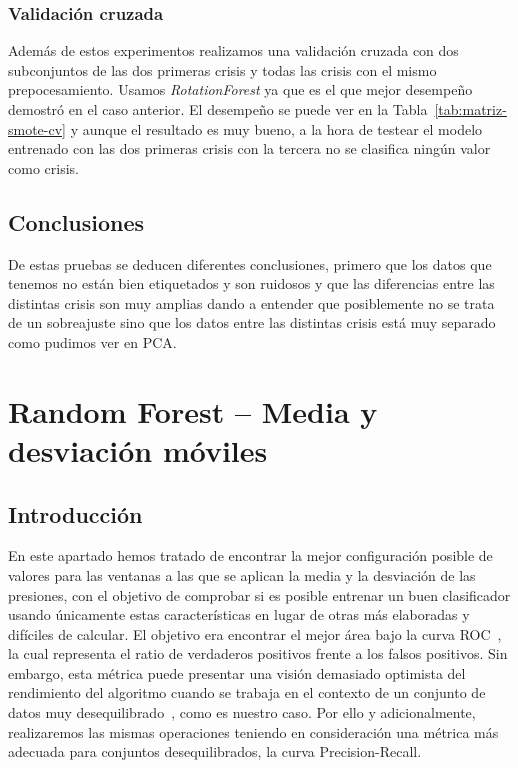 \documentclass[a4paper,12pt,twoside,oldfontcommands]{memoir}
\begin{document}
\subsection{Validación cruzada}
Además de estos experimentos realizamos una validación cruzada con dos subconjuntos de las dos primeras crisis y todas las crisis con el mismo prepocesamiento. Usamos \textit{RotationForest} ya que es el que mejor desempeño demostró en el caso anterior. El desempeño se puede ver en la Tabla~\ref{tab:matriz-smote-cv} y aunque el resultado es muy bueno, a la hora de testear el modelo entrenado con las dos primeras crisis con la tercera no se clasifica ningún valor como crisis.

\section{Conclusiones}
De estas pruebas se deducen diferentes conclusiones, primero que los datos que tenemos no están bien etiquetados y son ruidosos y que las diferencias entre las distintas crisis son muy amplias dando a entender que posiblemente no se trata de un sobreajuste sino que los datos entre las distintas crisis está muy separado como pudimos ver en PCA.


\chapter{Random Forest -- Media y desviación móviles} 
\section{Introducción}
En este apartado hemos tratado de encontrar la mejor configuración posible de valores para las ventanas a las que se aplican la media y la desviación de las presiones, con el objetivo de comprobar si es posible entrenar un buen clasificador usando únicamente estas características en lugar de otras más elaboradas y difíciles de calcular. El objetivo era encontrar el mejor área bajo la curva ROC~\cite{galar2012review}, la cual representa el ratio de verdaderos positivos frente a los falsos positivos. Sin embargo, esta métrica puede presentar una visión demasiado optimista del rendimiento del algoritmo cuando se trabaja en el contexto de un conjunto de datos muy desequilibrado~\cite{Davis2006RPR, saito2015pr}, como es nuestro caso. Por ello y adicionalmente, realizaremos las mismas operaciones teniendo en consideración una métrica más adecuada para conjuntos desequilibrados, la curva Precision-Recall. 
\end{document}
